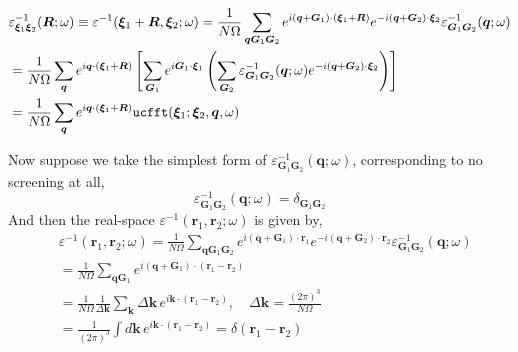 \documentclass[11pt, oneside]{article}          %
\begin{document}
\begin{equation}
  \label{eq:epsinv_G_to_xi}
  \begin{aligned}
    & \varepsilon^{-1}_{{\bm \xi}_1 {\bm \xi}_2} ({\bm R}; \omega) \equiv \varepsilon^{-1} ({\bm \xi}_1+{\bm R}, {\bm \xi}_2; \omega) = \frac{1}{N \Omega} \sum_{{\bm q} {\bm G}_1 {\bm G}_2} e^{i ({\bm q} + {\bm G}_1) \cdot ({\bm \xi}_1 + {\bm R})} e^{-i ({\bm q} + {\bm G}_2) \cdot {\bm \xi}_2} \varepsilon^{-1}_{{\bm G}_1 {\bm G}_2} ({\bm q};\omega) \\
    & = \frac{1}{N \Omega} \sum_{{\bm q}} e^{i {\bm q} \cdot ({\bm \xi}_1 + {\bm R})} \left [ \sum_{{\bm G}_1} e^{i {\bm G}_1 \cdot {\bm \xi}_1} \left ( \sum_{{\bm G}_2} \varepsilon^{-1}_{{\bm G}_1 {\bm G}_2} ({\bm q}; \omega) e^{-i ({\bm q} + {\bm G}_2) \cdot {\bm \xi}_2} \right ) \right ] \\
    & = \frac{1}{N \Omega} \sum_{{\bm q}} e^{i {\bm q} \cdot ( {\bm \xi}_1 + {\bm R} ) } {\tt ucfft}( {\bm \xi}_1; {\bm \xi}_2, {\bm q}, \omega)
  \end{aligned}
\end{equation}

Now suppose we take the simplest form of $\varepsilon^{-1}_{{\bm G}_1 {\bm G}_2} ({\bm q}; \omega)$, corresponding to no screening at all,
\begin{equation}
  \label{eq:simple_epsinv}
  \varepsilon^{-1}_{{\bm G}_1 {\bm G}_2} ({\bm q}; \omega) = \delta_{{\bm G}_1 {\bm G}_2}
\end{equation}
And then the real-space $\varepsilon^{-1}({\bm r}_1, {\bm r}_2; \omega)$ is given by,
\begin{equation}
  \label{eq:real_space_simple_epsinv}
  \begin{aligned}
    & \varepsilon^{-1} ({\bm r}_1, {\bm r}_2; \omega) = \frac{1}{N \Omega} \sum_{{\bm q} {\bm G}_1 {\bm G}_2} e^{i ({\bm q} + {\bm G}_1) \cdot {\bm r}_1} e^{-i ({\bm q} + {\bm G}_2) \cdot {\bm r}_2} \varepsilon^{-1}_{{\bm G}_1 {\bm G}_2} ({\bm q}; \omega) \\
    & = \frac{1}{N \Omega} \sum_{{\bm q} {\bm G}_1} e^{i ({\bm q} + {\bm G}_1) \cdot ({\bm r}_1 - {\bm r}_2)} \\
    & = \frac{1}{N \Omega} \frac{1}{\Delta {\bm k}} \sum_{{\bm k}} \Delta {\bm k} \, e^{i {\bm k} \cdot ({\bm r}_1 - {\bm r}_2)}, \quad \Delta {\bm k} = \frac{(2\pi)^3}{N \Omega} \\
    & = \frac{1}{(2 \pi)^3} \int d {\bm k}\, e^{i {\bm k} \cdot ({\bm r}_1 - {\bm r}_2)} = \delta ({\bm r}_1 - {\bm r}_2)
  \end{aligned}
\end{equation}
\end{document}
